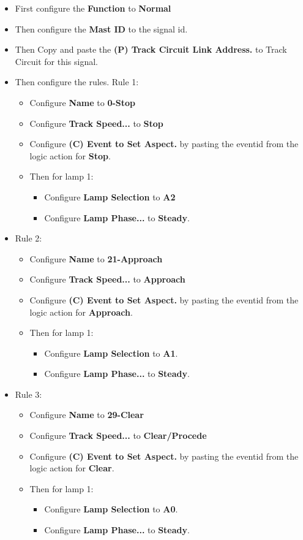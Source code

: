 \begin{itemize}
\item First configure the \textbf{Function} to \textbf{Normal}
\item Then configure the \textbf{Mast ID} to the signal id.
\item Then Copy and paste the \textbf{(P) Track Circuit Link Address.} to 
Track Circuit for this signal.
\item Then configure the rules. Rule 1:
\begin{itemize}
\item Configure \textbf{Name} to \textbf{0-Stop}
\item Configure \textbf{Track Speed...} to \textbf{Stop}
\item Configure \textbf{(C) Event to Set Aspect.} by pasting the eventid from 
the logic action for \textbf{Stop}.
\item Then for lamp 1:
\begin{itemize}
\item Configure \textbf{Lamp Selection} to \textbf{A2}
\item Configure \textbf{Lamp Phase...} to \textbf{Steady}.
\end{itemize}
\end{itemize}
\item Rule 2:
\begin{itemize}                                                                
\item Configure \textbf{Name} to \textbf{21-Approach}
\item Configure \textbf{Track Speed...} to \textbf{Approach}
\item Configure \textbf{(C) Event to Set Aspect.} by pasting the eventid from
the logic action for \textbf{Approach}.
\item Then for lamp 1:
\begin{itemize}
\item Configure \textbf{Lamp Selection} to \textbf{A1}.
\item Configure \textbf{Lamp Phase...} to \textbf{Steady}.
\end{itemize}
\end{itemize}
\item Rule 3:
\begin{itemize}
\item Configure \textbf{Name} to \textbf{29-Clear}
\item Configure \textbf{Track Speed...} to \textbf{Clear/Procede}
\item Configure \textbf{(C) Event to Set Aspect.} by pasting the eventid from 
the logic action for \textbf{Clear}.
\item Then for lamp 1:
\begin{itemize}
\item Configure \textbf{Lamp Selection} to \textbf{A0}.
\item Configure \textbf{Lamp Phase...} to \textbf{Steady}.
\end{itemize}
\end{itemize}
\end{itemize}


